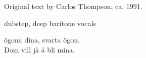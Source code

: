 
\begin{notes}
Original text by Carlos Thompson, ca. 1991.
\end{notes}
\begin{style}
dubstep, deep baritone vocals
\end{style}
\begin{lyrics}
ögona dina, svarta ögon.\\
Dom vill jà å bli mina.
\end{lyrics}


